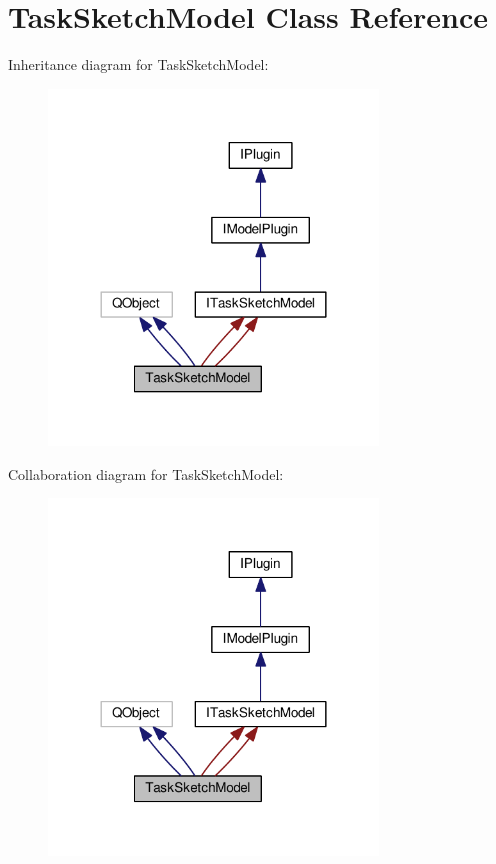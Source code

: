 \hypertarget{class_task_sketch_model}{}\section{Task\+Sketch\+Model Class Reference}
\label{class_task_sketch_model}


Inheritance diagram for Task\+Sketch\+Model\+:\nopagebreak
\begin{figure}[H]
\begin{center}
\leavevmode
\includegraphics[width=248pt]{class_task_sketch_model__inherit__graph}
\end{center}
\end{figure}


Collaboration diagram for Task\+Sketch\+Model\+:\nopagebreak
\begin{figure}[H]
\begin{center}
\leavevmode
\includegraphics[width=248pt]{class_task_sketch_model__coll__graph}
\end{center}
\end{figure}
